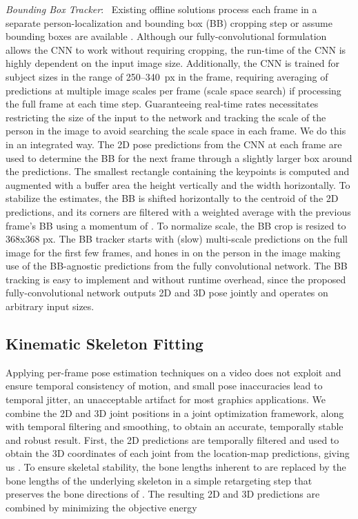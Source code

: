 \documentclass[acmtog]{acmart}
\newcommand{\parahead}[1]{\vspace{5pt}\noindent\emph{#1}:\ }
\newcommand{\change}[1]{{#1}}
\begin{document}
\parahead{Bounding Box Tracker}
Existing offline solutions process each frame in a separate person-localization and bounding box (BB) cropping step \cite{tekin_motion_comp_cvpr16,mehta_mlc3d_arxiv16} or assume bounding boxes are available \cite{tekin_structured_bmvc16,li_maximum_iccv2015,li_accv14,pavlakos_volumetric3d_arxiv16,zhou_deep_kinematic_arxiv16}.
Although our fully-convolutional formulation allows the CNN to work without requiring cropping, the run-time of the CNN is highly dependent on the input image size. Additionally, the CNN is trained for subject sizes in the range of 250--340~px in the frame, requiring averaging of predictions at multiple image scales per frame (scale space search) if processing the full frame at each time step. 
Guaranteeing real-time rates necessitates restricting the size of the input to the network and tracking the scale of the person in the image to avoid searching the scale space in each frame. 
We do this in an integrated way.
The 2D pose predictions from the CNN at each frame are used to determine the BB for the next frame through a slightly larger box around the predictions. 
\change{The smallest rectangle containing the keypoints  is computed and augmented with a buffer area  the height vertically and  the width horizontally. To stabilize the estimates, the BB is shifted horizontally to the centroid of the 2D predictions,}
and its corners are filtered with a weighted average with the previous frame's BB using a momentum of . 
To normalize scale, the BB crop is resized to 368x368 px.
The BB tracker starts with (slow) multi-scale predictions on the full image for the first few frames, and hones in on the person in the image making use of the BB-agnostic predictions from the fully convolutional network. 
The BB tracking is easy to implement and without runtime overhead, since the proposed fully-convolutional network outputs 2D and 3D pose jointly and operates on arbitrary input sizes. 


\subsection{Kinematic Skeleton Fitting}
\label{sec:tracker}

Applying per-frame pose estimation techniques on a video does not exploit and ensure temporal consistency of motion, and small pose inaccuracies lead to temporal jitter, an unacceptable artifact for most graphics applications.
We combine the 2D and 3D joint positions in a joint optimization framework, along with temporal filtering and smoothing, to obtain  
an accurate, temporally stable and robust result.
First, the 2D predictions  are temporally filtered \cite{casiez_1euro_sigchi12} and used to obtain the 3D coordinates of each joint from the location-map predictions, giving us . To ensure skeletal stability, the bone lengths inherent to  are replaced by the bone lengths of the underlying skeleton in a simple retargeting step that preserves the bone directions of . The resulting 2D and 3D predictions are combined by minimizing the objective energy
\end{document}
